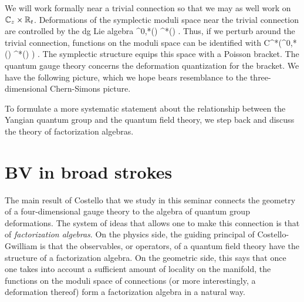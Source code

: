 \documentclass[10pt]{amsart}
\begin{document}
We will work formally near a trivial connection so that we may as well work on $\mathbb C_z \times \mathbb R_t$. 
Deformations of the symplectic moduli space near the trivial connection are controlled by the dg Lie algebra 
\ben
\Omega^{0,*}(\CC) \tensor \Omega^*(\RR) \tensor \fg .
\een 
Thus, if we perturb around the trivial connection, functions on the moduli space can be identified with
\ben
C^*(\Omega^{0,*} (\CC) \tensor \Omega^*(\RR) \tensor \fg) .
\een 
The symplectic structure equips this space with a Poisson bracket. 
The quantum gauge theory concerns the deformation quantization for the bracket. 
We have the following picture, which we hope bears resemblance to the three-dimensional Chern-Simons picture.
\ben
{}
\een

To formulate a more systematic statement about the relationship between the Yangian quantum group and the quantum field theory, we step back and discuss the theory of factorization algebras. 

\section{BV in broad strokes}

The main result of Costello \cite{CosYangian} that we study in this seminar connects the geometry of a four-dimensional gauge theory to the algebra of quantum group deformations. 
The system of ideas that allows one to make this connection is that of {\em factorization algebras}. 
On the physics side, the guiding principal of Costello-Gwilliam \cite{CG1, CG2} is that the observables, or operators, of a quantum field theory have the structure of a factorization algebra. 
On the geometric side, this says that once one takes into account a sufficient amount of locality on the manifold, the functions on the moduli space of connections (or more interestingly, a deformation thereof) form a factorization algebra in a natural way.  
\end{document}
